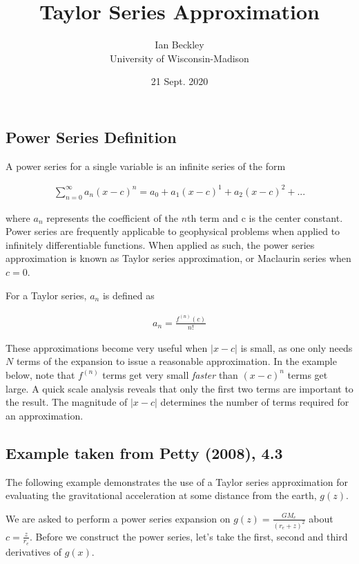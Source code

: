 \documentclass[a4paper,12pt]{article}
\begin{document}
\title{\vspace{-4.0cm}Taylor Series Approximation}
\author{Ian Beckley
\\University of Wisconsin-Madison}
\date{21 Sept. 2020}

\maketitle

\subsection*{Power Series Definition}
A power series for a single variable is an infinite series of the form

\begin{align*}
\sum_{n=0}^{\infty} a_n (x-c)^n = a_0 + a_1 (x - c)^1 + a_2 (x-c)^2 + \text{...}
\end{align*}

where $a_n$ represents the coefficient of the $n$th term and c is the center constant. Power series are frequently applicable to geophysical problems when applied to infinitely differentiable functions. When applied as such, the power series approximation is known as Taylor series approximation, or Maclaurin series when $c = 0$. 

For a Taylor series, $a_n$ is defined as 

\begin{align*}
a_n = \frac{f^{(n)}(c)}{n!}
\end{align*}

These approximations become very useful when $|x-c|$ is small, as one only needs $N$ terms of the expansion to issue a reasonable approximation. In the example below, note that $f^(n)$ terms get very small \emph{faster} than $(x-c)^n$ terms get large. A quick scale analysis reveals that only the first two terms are important to the result. The magnitude of $|x-c|$ determines the number of terms required for an approximation.

\subsection*{Example taken from Petty (2008), 4.3}
The following example demonstrates the use of a Taylor series approximation for evaluating the gravitational acceleration at some distance from the earth, $g(z)$.

We are asked to perform a power series expansion on $g(z) = \frac{GM_{e}}{(r_{e} + z)^{2}}$ about $c=\frac{z}{r_{e}}$. Before we construct the power series, let's take the first, second and third derivatives of $g(x)$. 
\end{document}
